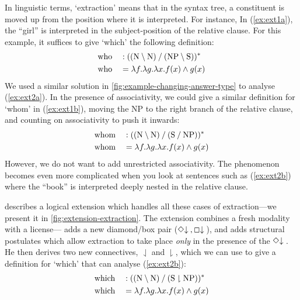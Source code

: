 In linguistic terms, `extraction' means that in the syntax tree, a
constituent is moved up from the position where it is interpreted. For
instance,
In (\ref{ex:ext1a}), the ``girl'' is interpreted in the
subject-position of the relative clause. For this example, it suffices
to give `which' the following definition:
\begin{alignat*}{3}
  &\text{who} &&: \tr[((\N\impr\N)\impl(\NP\impr\S))]\\
  &\text{who} &&= \lambda{f}.\lambda{g}.\lambda{x}.f(x)\wedge g(x)
\end{alignat*}
We used a similar solution in
\autoref{fig:example-changing-answer-type} to analyse (\ref{ex:ext2a}).
In the presence of associativity, we could give a similar definition
for `whom' in (\ref{ex:ext1b}), moving the NP to the right branch of
the relative clause, and counting on associativity to push it inwards:
\begin{alignat*}{3}
  &\text{whom} &&: \tr[((\N\impr\N)\impl(\S\impl\NP))]\\
  &\text{whom} &&= \lambda{f}.\lambda{g}.\lambda{x}.f(x)\wedge g(x)
\end{alignat*}
However, we do not want to add unrestricted associativity. The
phenomenon becomes even more complicated when you look at sentences
such as  (\ref{ex:ext2b}) where the ``book'' is interpreted deeply
nested in the relative clause.

\citet{moortgat1999b} describes a logical extension which handles all
these cases of extraction---we present it in
\autoref{fig:extension-extraction}.
The extension combines a fresh modality with a
license---\citet{moortgat1999b} adds a new diamond/box pair
($\diDn,\sqDn$), and adds structural postulates which allow extraction
to take place \emph{only} in the presence of the $\diDn$.
He then derives two new connectives, $\downharpoonleft$ and
$\downharpoonright$, which we can use to give a definition for
`which' that can analyse (\ref{ex:ext2b}):
\begin{alignat*}{3}
  &\text{which} &&: \tr[((\N\impr\N)\impl(\S\downharpoonright\NP))]\\
  &\text{which} &&= \lambda{f}.\lambda{g}.\lambda{x}.f(x)\wedge g(x)
\end{alignat*}

